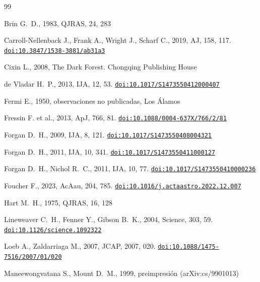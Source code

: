 \documentclass[useAMS,usenatbib,onecolumn]{mn2e}
\newcommand{\doi}[1]{\href{https://doi.org/#1}{\nolinkurl{doi:#1}}}
\begin{document}
\begin{thebibliography}{99}

Brin G.~D., 1983, QJRAS, 24, 283

Carroll-Nellenback J., Frank A., Wright J., Scharf C., 2019, AJ, 158, 117.
\newblock \doi{10.3847/1538-3881/ab31a3}

Cixin L., 2008, The Dark Forest. Chongqing Publishing House

de Vladar H.~P., 2013, IJA, 12, 53.
\newblock \doi{10.1017/S1473550412000407}

Fermi E., 1950, observaciones no publicadas, Los Álamos

Fressin F. et al., 2013, ApJ, 766, 81.
\newblock \doi{10.1088/0004-637X/766/2/81}

Forgan D.~H., 2009, IJA, 8, 121.
\newblock \doi{10.1017/S1473550408004321}

Forgan D.~H., 2011, IJA, 10, 341.
\newblock \doi{10.1017/S1473550411000127}

Forgan D.~H., Nichol R.~C., 2011, IJA, 10, 77.
\newblock \doi{10.1017/S1473550410000236}

Foucher F., 2023, AcAau, 204, 785.
\newblock \doi{10.1016/j.actaastro.2022.12.007}

Hart M.~H., 1975, QJRAS, 16, 128

Lineweaver C.~H., Fenner Y., Gibson B.~K., 2004, Science, 303, 59.
\newblock \doi{10.1126/science.1092322}

Loeb A., Zaldarriaga M., 2007, JCAP, 2007, 020.
\newblock \doi{10.1088/1475-7516/2007/01/020}

Maneewongvatana S., Mount D.~M., 1999, preimpresión (arXiv:cs/9901013)


\end{thebibliography}
\end{document}
